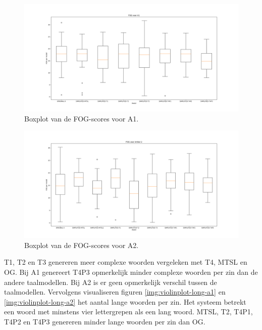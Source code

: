 \begin{figure}[H]
	\includegraphics[width=\linewidth]{img/boxplot-fog-a1.png}
	\caption{Boxplot van de FOG-scores voor A1.}
	\label{img:boxplot-fog-a1}
\end{figure}

\begin{figure}[H]
	\includegraphics[width=\linewidth]{img/boxplot-fog-a2.png}
	\caption{Boxplot van de FOG-scores voor A2.}
	\label{img:boxplot-fog-a2}
\end{figure}

T1, T2 en T3 genereren meer complexe woorden vergeleken met T4, MTSL en OG. Bij A1 genereert T4P3 opmerkelijk minder complexe woorden per zin dan de andere taalmodellen. Bij A2 is er geen opmerkelijk verschil tussen de taalmodellen. Vervolgens visualiseren figuren \ref{img:violinplot-long-a1} en \ref{img:violinplot-long-a2} het aantal lange woorden per zin. Het systeem betrekt een woord met minstens vier lettergrepen als een lang woord. MTSL, T2, T4P1, T4P2 en T4P3 genereren minder lange woorden per zin dan OG.

